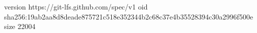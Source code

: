 version https://git-lfs.github.com/spec/v1
oid sha256:19ab2aa8d8deade875721c518e352344b2c68c37e4b35528394c30a2996f500e
size 22004
